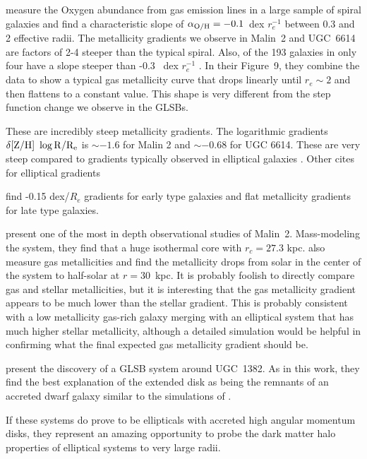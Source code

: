 \documentclass{emulateapj}
\begin{document}
\citet{Sanchez14} measure the Oxygen abundance from gas emission lines in a large sample of spiral galaxies and find a characteristic slope of $\alpha_{\rm{O/H}} = -0.1$\ dex $r_e^{-1}$ between 0.3 and 2 effective radii.  The metallicity gradients we observe in Malin~2 and UGC~6614 are factors of 2-4 steeper than the typical spiral. Also, of the 193 galaxies in \citet{Sanchez14} only four have a slope steeper than -0.3 \ dex $r_e^{-1}$ \citep[Figure~6]{Sanchez14}.  In their Figure~9, they combine the data to show a typical gas metallicity curve that drops linearly until $r_e\sim2$ and then flattens to a constant value.  This shape is very different from the step function change we observe in the GLSBs.


These are incredibly steep metallicity gradients.  The logarithmic gradients $\delta \rm{[Z/H]}\ \log{R/R_e}$ is $\sim -1.6$ for Malin 2 and $\sim -0.68$ for UGC 6614.  These are very steep compared to gradients typically observed in elliptical galaxies \citep{Greene12, Greene15}.  Other cites for elliptical gradients \citep{Kuntschner10}

\citet{Wilkinson15} find -0.15 dex/$R_e$ gradients for early type galaxies and flat metallicity gradients for late type galaxies. 




\citet{Kasparova14} present one of the most in depth observational studies of Malin~2.  Mass-modeling the system, they find that a huge isothermal core with $r_c=27.3$ kpc.  \citet{Kasparova14} also measure gas metallicities and find the metallicity drops from solar in the center of the system to half-solar at $r=30$\ kpc.  It is probably foolish to directly compare gas and stellar metallicities, but it is interesting that the gas metallicity gradient appears to be much lower than the stellar gradient.  This is probably consistent with a low metallicity gas-rich galaxy merging with an elliptical system that has much higher stellar metallicity, although a detailed simulation would be helpful in confirming what the final expected gas metallicity gradient should be.


\citet{Hagen16} present the discovery of a GLSB system around UGC~1382.  As in this work, they find the best explanation of the extended disk as being the remnants of an accreted dwarf galaxy similar to the simulations of \citet{Pen06}. 

If these systems do prove to be ellipticals with accreted high angular momentum disks, they represent an amazing opportunity to probe the dark matter halo properties of elliptical systems to very large radii. 
\end{document}
